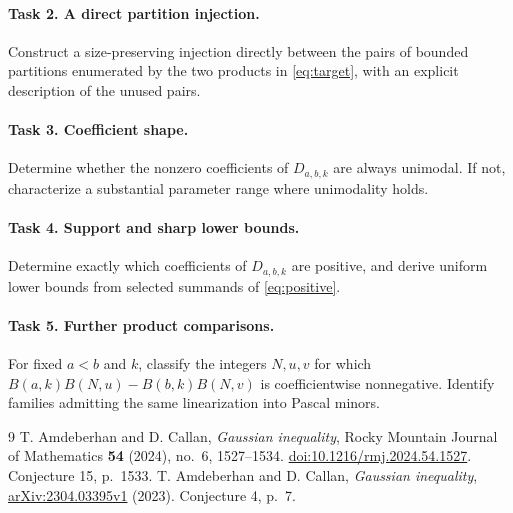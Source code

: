 \documentclass[11pt]{article}
\begin{document}
\paragraph{Task 2. A direct partition injection.}
Construct a size-preserving injection directly between the pairs
of bounded partitions enumerated by the two products in
\eqref{eq:target}, with an explicit description of the unused pairs.

\paragraph{Task 3. Coefficient shape.}
Determine whether the nonzero coefficients of \(D_{a,b,k}\) are
always unimodal. If not, characterize a substantial parameter
range where unimodality holds.

\paragraph{Task 4. Support and sharp lower bounds.}
Determine exactly which coefficients of \(D_{a,b,k}\) are positive,
and derive uniform lower bounds from selected summands of
\eqref{eq:positive}.

\paragraph{Task 5. Further product comparisons.}
For fixed \(a<b\) and \(k\), classify the integers \(N,u,v\) for which
\(B(a,k)B(N,u)-B(b,k)B(N,v)\) is coefficientwise nonnegative.
Identify families admitting the same linearization into Pascal minors.

\begin{thebibliography}{9}
T. Amdeberhan and D. Callan,
\emph{Gaussian inequality},
Rocky Mountain Journal of Mathematics \textbf{54} (2024),
no.~6, 1527--1534.
\href{https://doi.org/10.1216/rmj.2024.54.1527}{doi:10.1216/rmj.2024.54.1527}.
Conjecture 15, p.~1533.
T. Amdeberhan and D. Callan,
\emph{Gaussian inequality},
\href{https://arxiv.org/abs/2304.03395v1}{arXiv:2304.03395v1} (2023).
Conjecture 4, p.~7.
\end{thebibliography}
\end{document}
